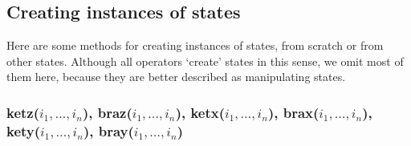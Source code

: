 \documentclass[leqno]{article}
\newcommand{\func}[2]{{\bf #1}($#2$)}
\newcommand{\fs}[1]{{\bf #1}}
\begin{document}
\subsection{Creating instances of states}
Here are some methods for creating instances of states, from scratch or
from other states. Although all operators  `create' states in this
sense, we omit most of them here, because they are better described as manipulating
states.


\subsubsection{\func{ketz}{i_1,\ldots,i_n}, \func{braz}{i_1,\ldots,i_n},
\func{ketx}{i_1,\ldots,i_n}, \func{brax}{i_1,\ldots,i_n},
  \func{kety}{i_1,\ldots,i_n}, \func{bray}{i_1,\ldots,i_n}}
 
\end{document}
